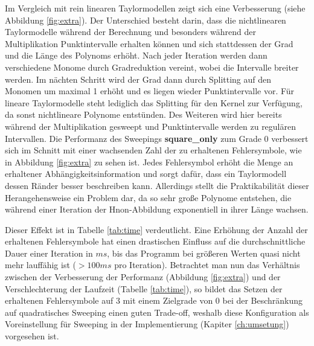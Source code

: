 Im Vergleich mit rein linearen Taylormodellen zeigt sich eine Verbesserung (siehe Abbildung \ref{fig:extra}). Der Unterschied besteht darin, dass die nichtlinearen Taylormodelle während der Berechnung und besonders während der Multiplikation Punktintervalle erhalten können und sich stattdessen der Grad und die Länge des Polynoms erhöht. Nach jeder Iteration werden dann verschiedene Monome durch Gradreduktion vereint, wobei die Intervalle breiter werden. Im nächten Schritt wird der Grad dann durch Splitting auf den Monomen um maximal 1 erhöht und es liegen wieder Punktintervalle vor. Für lineare Taylormodelle steht lediglich das Splitting für den Kernel zur Verfügung, da sonst nichtlineare Polynome entstünden. Des Weiteren wird hier bereits während der Multiplikation gesweept und Punktintervalle werden zu regulären Intervallen. Die Performanz des Sweepings \textbf{square\_only} zum Grade 0 verbessert sich im Schnitt mit einer wachsenden Zahl der zu erhaltenen Fehlersymbole, wie in Abbildung \ref{fig:extra} zu sehen ist. Jedes Fehlersymbol erhöht die Menge an erhaltener Abhängigkeitsinformation und sorgt dafür, dass ein Taylormodell dessen Ränder besser beschreiben kann. Allerdings stellt die Praktikabilität dieser Herangehensweise ein Problem dar, da so sehr große Polynome entstehen, die während einer Iteration der H\e non-Abbildung exponentiell in ihrer Länge wachsen.
 


 Dieser Effekt ist in Tabelle \ref{tab:time} verdeutlicht. Eine Erhöhung der Anzahl der erhaltenen Fehlersymbole hat einen drastischen Einfluss auf die durchschnittliche Dauer einer Iteration in $ms$, bis das Programm bei größeren Werten quasi nicht mehr lauffähig ist ($>100ms$ pro Iteration). Betrachtet man nun das Verhältnis zwischen der Verbesserung der Performanz (Abbildung \ref{fig:extra}) und der Verschlechterung der Laufzeit (Tabelle \ref{tab:time}), so bildet das Setzen der erhaltenen Fehlersymbole auf 3 mit einem Zielgrade von 0 bei der Beschränkung auf quadratisches Sweeping einen guten Trade-off, weshalb diese Konfiguration als Voreinstellung für Sweeping in der Implementierung (Kapiter \ref{ch:umsetung}) vorgesehen ist.
 
